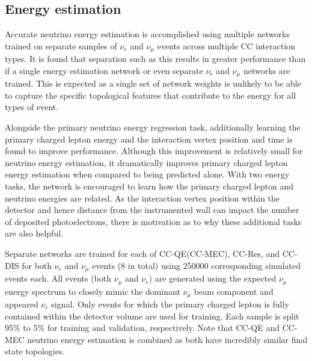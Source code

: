 \subsection{Energy estimation} %
\label{sec:cvn_specific_energy} %

Accurate neutrino energy estimation is accomplished using multiple networks trained on separate
samples of $\nu_{e}$ and $\nu_{\mu}$ events across multiple CC interaction types. It is found that
separation such as this results in greater performance than if a single energy estimation network
or even separate $\nu_{e}$ and $\nu_{\mu}$ networks are trained. This is expected as a single set
of network weights is unlikely to be able to capture the specific topological features that
contribute to the energy for all types of event.

Alongside the primary neutrino energy regression task, additionally learning the primary charged
lepton energy and the interaction vertex position and time is found to improve performance.
Although this improvement is relatively small for neutrino energy estimation, it dramatically
improves primary charged lepton energy estimation when compared to being predicted alone. With two
energy tasks, the network is encouraged to learn how the primary charged lepton and neutrino
energies are related. As the interaction vertex position within the detector and hence distance
from the instrumented wall can impact the number of deposited photoelectrons, there is motivation
as to why these additional tasks are also helpful.

Separate networks are trained for each of CC-QE(CC-MEC), CC-Res, and CC-DIS for both $\nu_{e}$ and
$\nu_{\mu}$ events (8 in total) using 250000 corresponding simulated events each. All events (both
$\nu_{\mu}$ and $\nu_{e}$) are generated using the expected \chips $\nu_{\mu}$ energy spectrum to
closely mimic the dominant $\nu_{\mu}$ beam component and appeared $\nu_{e}$ signal. Only events
for which the primary charged lepton is fully contained within the detector volume are used for
training. Each sample is split 95\% to 5\% for training and validation, respectively. Note that
CC-QE and CC-MEC neutrino energy estimation is combined as both have incredibly similar final
state topologies.

